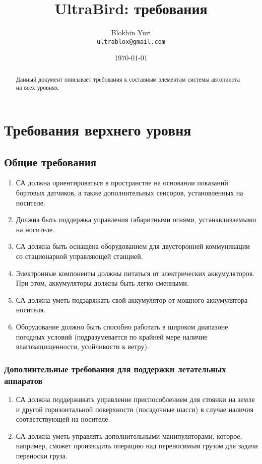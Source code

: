 \documentclass[utf8]{report}
\begin{document}
 
\title{UltraBird: требования}
\author{Blokhin Yuri\\
        \texttt{ultrablox@gmail.com}}
\date{\today}
\maketitle

\tableofcontents
 
\begin{abstract}
Данный документ описывает требования к составным элементам системы автопилота на всех уровнях. 
\end{abstract}
 
\chapter{Требования верхнего уровня}

\section{Общие требования}

\begin{enumerate}
  \item СА должна ориентироваться в пространстве на основании показаний бортовых датчиков, а также дополнительных сенсоров, установленных на носителе.
  \item Должна быть поддержка управления габаритными огнями, устанавливаемыми на носителе.
  \item СА должна быть оснащёна оборудованием для двусторонней коммуникации со стационарной управляющей станцией.
  \item Электронные компоненты должны питаться от электрических аккумуляторов. При этом, аккумуляторы должны быть легко сменными.
  \item СА должна уметь подзаряжать свой аккумулятор от мощного аккумулятора носителя.
  \item Оборудование должно быть способно работать в широком диапазоне погодных условий (подразумевается по крайней мере наличие влагозащищенности, усойчивости к ветру).
\end{enumerate}

\subsection{Дополнительные требования для поддержки летательных аппаратов}

\begin{enumerate}
    \item СА должна поддерживать управление приспособлением для стоянки на земле и другой горизонтальной поверхности (посадочные шасси) в случае наличия соответствующей на носителе.
    \item СА должна уметь управлять дополнительными манипуляторами, которое, например, сможет производить операцию над переносимым грузом для задачи переноски груза.
\end{enumerate}
\end{document}
